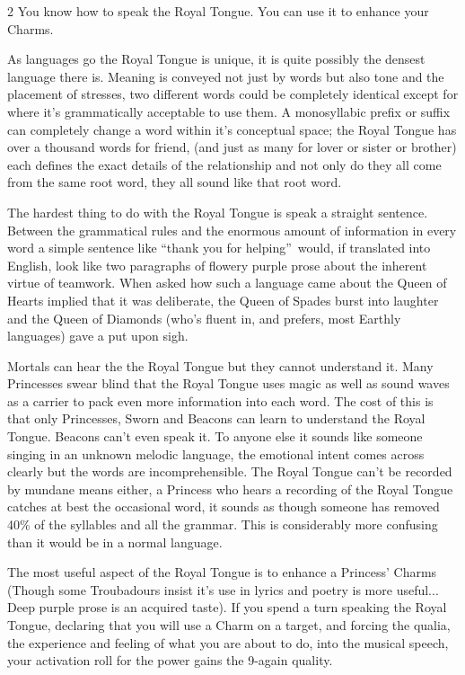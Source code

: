 \begin{multicols}{2}
\noindent You know how to speak the Royal Tongue. You can use it to enhance your Charms.

As languages go the Royal Tongue is unique, it is quite possibly the densest language there is. Meaning is conveyed not just by words but also tone and the placement of stresses, two different words could be completely identical except for where it's grammatically acceptable to use them. A monosyllabic prefix or suffix can completely change a word within it's conceptual space; the Royal Tongue has over a thousand words for friend, (and just as many for lover or sister or brother) each defines the exact details of the relationship and not only do they all come from the same root word, they all sound like that root word.

The hardest thing to do with the Royal Tongue is speak a straight sentence. Between the grammatical rules and the enormous amount of information in every word a simple sentence like \textquotedblleft thank you for helping\textquotedblright\, would, if translated into English, look like two paragraphs of flowery purple prose about the inherent virtue of teamwork. When asked how such a language came about the Queen of Hearts implied that it was deliberate, the Queen of Spades burst into laughter and the Queen of Diamonds (who's fluent in, and prefers, most Earthly languages) gave a put upon sigh.

Mortals can hear the the Royal Tongue but they cannot understand it. Many Princesses swear blind that the Royal Tongue uses magic as well as sound waves as a carrier to pack even more information into each word. The cost of this is that only Princesses, Sworn and Beacons can learn to understand the Royal Tongue. Beacons can't even speak it. To anyone else it sounds like someone singing in an unknown melodic language, the emotional intent comes across clearly but the words are incomprehensible. The Royal Tongue can't be recorded by mundane means either, a Princess who hears a recording of the Royal Tongue catches at best the occasional word, it sounds as though someone has removed 40\% of the syllables and all the grammar. This is considerably more confusing than it would be in a normal language.

The most useful aspect of the Royal Tongue is to enhance a Princess' Charms (Though some Troubadours insist it's use in lyrics and poetry is more useful... Deep purple prose is an acquired taste). If you spend a turn speaking the Royal Tongue, declaring that you will use a Charm on a target, and forcing the qualia, the experience and feeling of what you are about to do, into the musical speech, your activation roll for the power gains the 9-again quality. 


\end{multicols}
